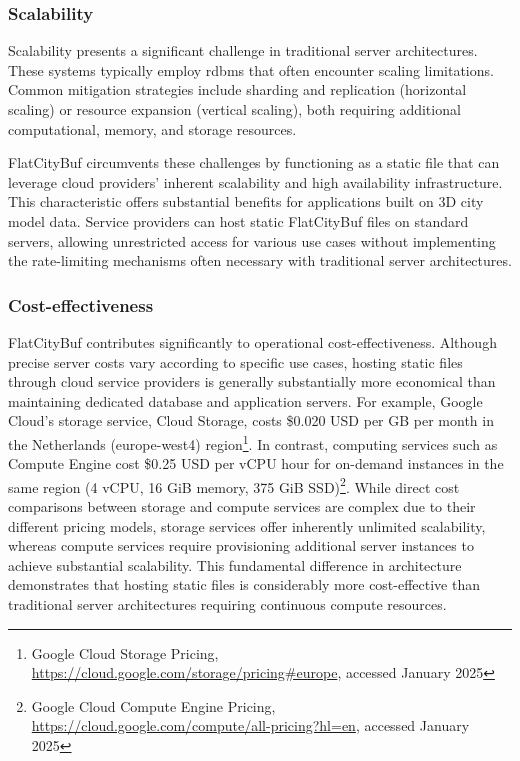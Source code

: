 \subsubsection{Scalability}
\label{scalability}

Scalability presents a significant challenge in traditional server architectures. These systems typically employ \ac{rdbms} that often encounter scaling limitations. Common mitigation strategies include sharding and replication (horizontal scaling) or resource expansion (vertical scaling), both requiring additional computational, memory, and storage resources.

FlatCityBuf circumvents these challenges by functioning as a static file that can leverage cloud providers' inherent scalability and high availability infrastructure. This characteristic offers substantial benefits for applications built on 3D city model data. Service providers can host static FlatCityBuf files on standard servers, allowing unrestricted access for various use cases without implementing the rate-limiting mechanisms often necessary with traditional server architectures.

\subsubsection{Cost-effectiveness}
\label{cost_effectiveness}

FlatCityBuf contributes significantly to operational cost-effectiveness. Although precise server costs vary according to specific use cases, hosting static files through cloud service providers is generally substantially more economical than maintaining dedicated database and application servers.
For example, Google Cloud's storage service, Cloud Storage, costs \$0.020 USD per GB per month in the Netherlands (europe-west4) region\footnote{Google Cloud Storage Pricing, \url{https://cloud.google.com/storage/pricing\#europe}, accessed January 2025}.
In contrast, computing services such as Compute Engine cost \$0.25 USD per vCPU hour for on-demand instances in the same region (4 vCPU, 16 GiB memory, 375 GiB SSD)\footnote{Google Cloud Compute Engine Pricing, \url{https://cloud.google.com/compute/all-pricing?hl=en}, accessed January 2025}.
While direct cost comparisons between storage and compute services are complex due to their different pricing models, storage services offer inherently unlimited scalability, whereas compute services require provisioning additional server instances to achieve substantial scalability.
This fundamental difference in architecture demonstrates that hosting static files is considerably more cost-effective than traditional server architectures requiring continuous compute resources.

